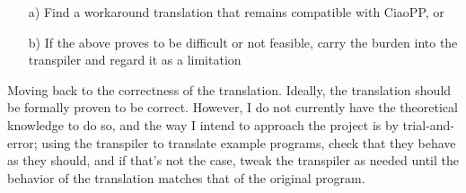 \documentclass[11pt]{article}
\begin{document}
\begin{enumerate}
\item[a)] Find a workaround translation that remains compatible with CiaoPP, or
\item[b)] If the above proves to be difficult or not feasible,
  carry the burden into the transpiler and regard it as a limitation
\end{enumerate}

Moving back to the correctness of the translation. Ideally, the translation
should be formally proven to be correct. However, I do not currently have
the theoretical knowledge to do so, and the way I intend to approach
the project is by trial-and-error; using the transpiler to translate example programs,
check that they behave as they should, and if that's not the case, tweak the
transpiler as needed until the behavior of the translation matches that
of the original program.

\printbibliography
\end{document}
